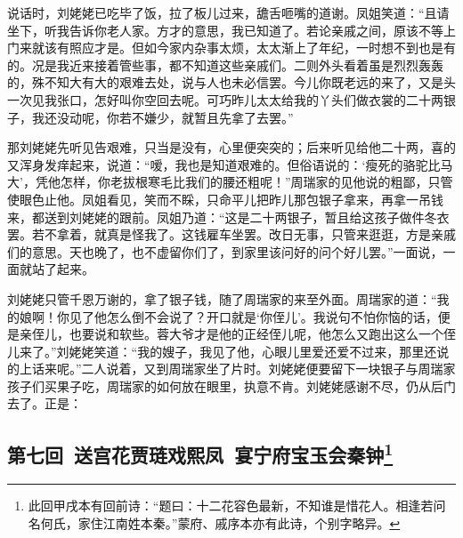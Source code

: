 \par 说话时，刘姥姥已吃毕了饭，拉了板儿过来，舚舌咂嘴的道谢。凤姐笑道：“且请坐下，听我告诉你老人家。方才的意思，我已知道了。若论亲戚之间，原该不等上门来就该有照应才是。但如今家内杂事太烦，太太渐上了年纪，一时想不到也是有的。况是我近来接着管些事，都不知道这些亲戚们。二则外头看着虽是烈烈轰轰的，殊不知大有大的艰难去处，说与人也未必信罢。今儿你既老远的来了，又是头一次见我张口，怎好叫你空回去呢。可巧昨儿太太给我的丫头们做衣裳的二十两银子，我还没动呢，你若不嫌少，就暂且先拿了去罢。”
\par 那刘姥姥先听见告艰难，只当是没有，心里便突突的；后来听见给他二十两，喜的又浑身发痒起来，说道：“嗳，我也是知道艰难的。但俗语说的：‘瘦死的骆驼比马大’，凭他怎样，你老拔根寒毛比我们的腰还粗呢！”周瑞家的见他说的粗鄙，只管使眼色止他。凤姐看见，笑而不睬，只命平儿把昨儿那包银子拿来，再拿一吊钱来，都送到刘姥姥的跟前。凤姐乃道：“这是二十两银子，暂且给这孩子做件冬衣罢。若不拿着，就真是怪我了。这钱雇车坐罢。改日无事，只管来逛逛，方是亲戚们的意思。天也晚了，也不虚留你们了，到家里该问好的问个好儿罢。”一面说，一面就站了起来。
\par 刘姥姥只管千恩万谢的，拿了银子钱，随了周瑞家的来至外面。周瑞家的道：“我的娘啊！你见了他怎么倒不会说了？开口就是‘你侄儿’。我说句不怕你恼的话，便是亲侄儿，也要说和软些。蓉大爷才是他的正经侄儿呢，他怎么又跑出这么一个侄儿来了。”刘姥姥笑道：“我的嫂子，我见了他，心眼儿里爱还爱不过来，那里还说的上话来呢。”二人说着，又到周瑞家坐了片时。刘姥姥便要留下一块银子与周瑞家孩子们买果子吃，周瑞家的如何放在眼里，执意不肯。刘姥姥感谢不尽，仍从后门去了。正是：


\subsection*{第七回\ 送宫花贾琏戏熙凤\ 宴宁府宝玉会秦钟\footnote{此回甲戌本有回前诗：“题曰：十二花容色最新，不知谁是惜花人。相逢若问名何氏，家住江南姓本秦。”蒙府、戚序本亦有此诗，个别字略异。}}

